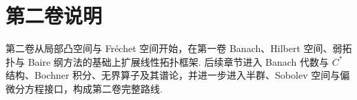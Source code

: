 \chapter*{第二卷说明}
第二卷从局部凸空间与 Fréchet 空间开始，在第一卷 Banach、Hilbert 空间、弱拓扑与 Baire 纲方法的基础上扩展线性拓扑框架. 后续章节进入 Banach 代数与 \(\displaystyle C^*\) 结构、Bochner 积分、无界算子及其谱论，并进一步进入半群、Sobolev 空间与偏微分方程接口，构成第二卷完整路线.
